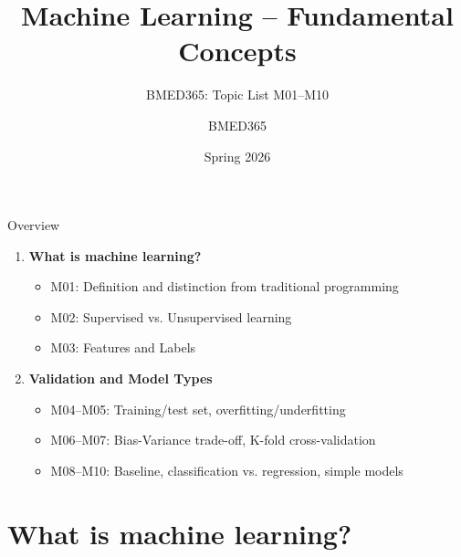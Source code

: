 \documentclass[aspectratio=169, 10pt]{beamer}
\title{Machine Learning -- Fundamental Concepts}
\subtitle{BMED365: Topic List M01--M10}
\author{BMED365}
\date{Spring 2026}
\begin{document}
\begin{frame}
    \titlepage
\end{frame}

\begin{frame}{Overview}
    \begin{enumerate}
        \item \textbf{What is machine learning?}
        \begin{itemize}
            \item M01: Definition and distinction from traditional programming
            \item M02: Supervised vs. Unsupervised learning
            \item M03: Features and Labels
        \end{itemize}
        \item \textbf{Validation and Model Types}
        \begin{itemize}
            \item M04--M05: Training/test set, overfitting/underfitting
            \item M06--M07: Bias-Variance trade-off, K-fold cross-validation
            \item M08--M10: Baseline, classification vs. regression, simple models
        \end{itemize}
    \end{enumerate}
\end{frame}

\section{What is machine learning?}
\end{document}

